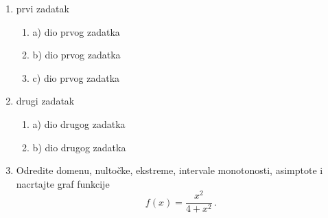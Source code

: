 \documentclass[a4paper,11pt]{article}
\begin{document}
\begin{enumerate}
\item prvi zadatak
\begin{enumerate}
\item a) dio prvog zadatka
\item b) dio prvog zadatka
\item c) dio prvog zadatka
\end{enumerate}


\item drugi zadatak
\begin{enumerate}
\item a) dio drugog zadatka
\item b) dio drugog zadatka
\end{enumerate}


\item Odredite domenu, nulto\v{c}ke, ekstreme, intervale monotonosti, asimptote i nacrtajte graf funkcije $$f(x)=\frac{x^2}{4+x^2}\,.$$

\setcounter{grupe}{\value{enumi}}
\end{enumerate}
\end{document}

